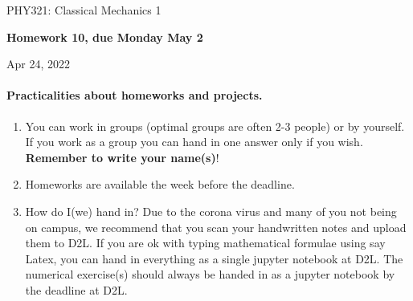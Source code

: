 \documentclass[%
oneside,                 %
final,                   %
10pt]{article}
\begin{document}

\newcommand{\exercisesection}[1]{\subsection*{#1}}






\thispagestyle{empty}

\begin{center}
{\LARGE\bf
\begin{spacing}{1.25}
PHY321: Classical Mechanics 1
\end{spacing}
}
\end{center}


\begin{center}
{\bf Homework 10, due Monday May 2${}^{}$} \\ [0mm]
\end{center}

\begin{center}
\end{center}
    

\begin{center}
Apr 24, 2022
\end{center}

\vspace{1cm}


\paragraph{Practicalities about  homeworks and projects.}
\begin{enumerate}
\item You can work in groups (optimal groups are often 2-3 people) or by yourself. If you work as a group you can hand in one answer only if you wish. \textbf{Remember to write your name(s)}!

\item Homeworks are available  the week before the deadline. 

\item How do I(we)  hand in?  Due to the corona virus and many of you not being on campus, we recommend that you scan your handwritten notes and upload them to D2L. If you are ok with typing mathematical formulae using say Latex, you can hand in everything as a single jupyter notebook at D2L. The numerical exercise(s) should always be handed in as a jupyter notebook by the deadline at D2L. 
\end{enumerate}
\end{document}
